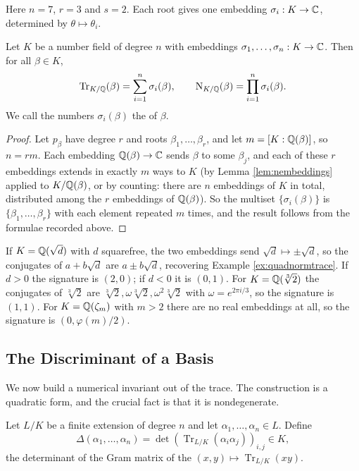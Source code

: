 \documentclass[a4paper]{scrartcl}
\newcommand{\Nm}{\operatorname{N}}
\newcommand{\Tr}{\operatorname{Tr}}
\begin{document}
Here $n = 7$, $r = 3$ and $s = 2$. Each root gives one embedding $\sigma_i : K \to \mathbb{C}$, determined by $\theta \mapsto \theta_i$.

\begin{lemma}\label{lem:normtraceembed}
	Let $K$ be a number field of degree $n$ with embeddings $\sigma_1, \dots, \sigma_n : K \to \mathbb{C}$. Then for all $\beta \in K$,
	$$\Tr_{K/\Q}(\beta) = \sum_{i=1}^n \sigma_i(\beta), \qquad \Nm_{K/\Q}(\beta) = \prod_{i=1}^n \sigma_i(\beta).$$
	We call the numbers $\sigma_i(\beta)$ the  of $\beta$.
\end{lemma}

\begin{proof}
	Let $p_\beta$ have degree $r$ and roots $\beta_1, \dots, \beta_r$, and let $m = [K : \mathbb{Q}(\beta)]$, so $n = rm$. Each embedding $\mathbb{Q}(\beta) \to \mathbb{C}$ sends $\beta$ to some $\beta_j$, and each of these $r$ embeddings extends in exactly $m$ ways to $K$ (by Lemma \ref{lem:nembeddings} applied to $K/\mathbb{Q}(\beta)$, or by counting: there are $n$ embeddings of $K$ in total, distributed among the $r$ embeddings of $\mathbb{Q}(\beta)$). So the multiset $\{\sigma_i(\beta)\}$ is $\{\beta_1, \dots, \beta_r\}$ with each element repeated $m$ times, and the result follows from the formulae recorded above.
\end{proof}

\begin{example}
	If $K = \mathbb{Q}(\sqrt d)$ with $d$ squarefree, the two embeddings send $\sqrt d \mapsto \pm\sqrt d$, so the conjugates of $a + b\sqrt d$ are $a \pm b\sqrt d$, recovering Example \ref{ex:quadnormtrace}. If $d > 0$ the signature is $(2, 0)$; if $d < 0$ it is $(0,1)$. For $K = \mathbb{Q}(\sqrt[3]{2})$ the conjugates of $\sqrt[3]2$ are $\sqrt[3]2, \omega\sqrt[3]2, \omega^2\sqrt[3]2$ with $\omega = e^{2\pi i/3}$, so the signature is $(1,1)$. For $K = \mathbb{Q}(\zeta_m)$ with $m > 2$ there are no real embeddings at all, so the signature is $(0, \varphi(m)/2)$.
\end{example}

\subsection{The Discriminant of a Basis}

We now build a numerical invariant out of the trace. The construction is a quadratic form, and the crucial fact is that it is nondegenerate.

\begin{definition}
	Let $L/K$ be a finite extension of degree $n$ and let $\alpha_1, \dots, \alpha_n \in L$. Define
	$$\Delta(\alpha_1, \dots, \alpha_n) = \det\left( \Tr_{L/K}(\alpha_i\alpha_j) \right)_{i,j} \in K,$$
	the determinant of the Gram matrix of the  $(x,y) \mapsto \Tr_{L/K}(xy)$.
\end{definition}
\end{document}
